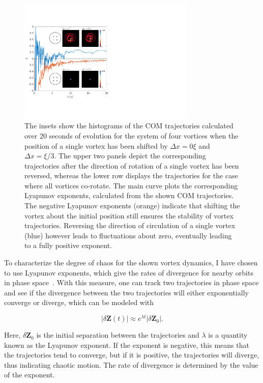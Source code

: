\begin{figure}
\center \includegraphics[width=0.75\textwidth]{data/2d/lyap/lyap}

\caption{
The insets show the histograms of the COM trajectories calculated over 20 seconds of evolution for the system of four vortices when the position of a single vortex has been shifted by $\Delta x=0\xi$ and $\Delta x=\xi/3$.
The upper two panels depict the corresponding trajectories after the direction of rotation of a single vortex has been reversed, whereas the lower row displays the trajectories for the case where all vortices co-rotate.
The main curve plots the corresponding Lyapunov exponents,  calculated from the shown COM trajectories. 
The negative Lyapunov exponents (orange) indicate that shifting the vortex about the initial position still ensures the stability of vortex trajectories. Reversing the direction of circulation of a single vortex (blue) however leads to fluctuations about zero, eventually leading to a fully positive exponent. 
}
\label{fig:lyap}
\end{figure}


To characterize the degree of chaos for the shown vortex dynamics, I have chosen to use Lyapunov exponents, which give the rates of divergence for nearby orbits in phase space~\cite{wolf1985}.
With this measure, one can track two trajectories in phase space and see if the divergence between the two trajectories will either exponentially converge or diverge, which can be modeled with

\begin{equation}
|\delta\mathbf{Z}(t)| \approx e^{\lambda t} |\delta \mathbf{Z}_0|.
\end{equation}

\noindent Here, $\delta\mathbf{Z}_0$ is the initial separation between the trajectories and $\lambda$ is a quantity known as the Lyapunov exponent.
If the exponent is negative, this means that the trajectories tend to converge, but if it is positive, the trajectories will diverge, thus indicating chaotic motion.
The rate of divergence is determined by the value of the exponent.

